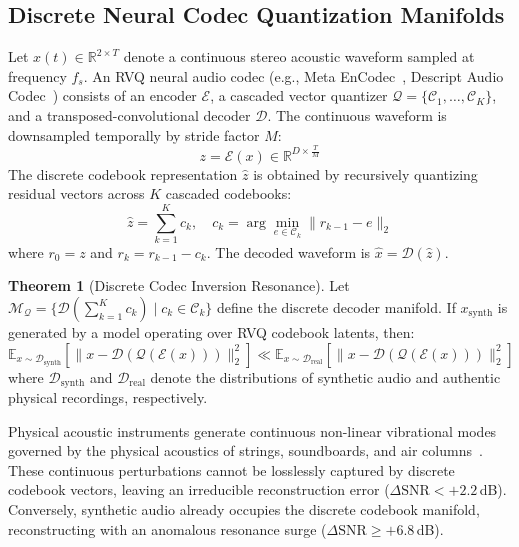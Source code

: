\documentclass[conference]{IEEEtran}
\theoremstyle{definition}
\newtheorem{theorem}{Theorem}
\begin{document}
\subsection{Discrete Neural Codec Quantization Manifolds}
Let $x(t) \in \mathbb{R}^{2 \times T}$ denote a continuous stereo acoustic waveform sampled at frequency $f_s$. An RVQ neural audio codec (e.g., Meta EnCodec~\cite{defossez2022high}, Descript Audio Codec~\cite{kumar2023high}) consists of an encoder $\mathcal{E}$, a cascaded vector quantizer $\mathcal{Q} = \{\mathcal{C}_1, \dots, \mathcal{C}_K\}$, and a transposed-convolutional decoder $\mathcal{D}$. The continuous waveform is downsampled temporally by stride factor $M$:
\begin{equation}
z = \mathcal{E}(x) \in \mathbb{R}^{D \times \frac{T}{M}}
\end{equation}
The discrete codebook representation $\hat{z}$ is obtained by recursively quantizing residual vectors across $K$ cascaded codebooks:
\begin{equation}
\hat{z} = \sum_{k=1}^K c_k, \quad c_k = \arg\min_{e \in \mathcal{C}_k} \| r_{k-1} - e \|_2
\end{equation}
where $r_0 = z$ and $r_k = r_{k-1} - c_k$. The decoded waveform is $\hat{x} = \mathcal{D}(\hat{z})$.

\begin{theorem}[Discrete Codec Inversion Resonance]
Let $\mathcal{M}_{\mathcal{Q}} = \{ \mathcal{D}(\sum_{k=1}^K c_k) \mid c_k \in \mathcal{C}_k \}$ define the discrete decoder manifold. If $x_{\text{synth}}$ is generated by a model operating over RVQ codebook latents, then:
\begin{equation}
\mathbb{E}_{x \sim \mathcal{D}_{\text{synth}}}\left[ \| x - \mathcal{D}(\mathcal{Q}(\mathcal{E}(x))) \|_2^2 \right] \ll \mathbb{E}_{x \sim \mathcal{D}_{\text{real}}}\left[ \| x - \mathcal{D}(\mathcal{Q}(\mathcal{E}(x))) \|_2^2 \right]
\end{equation}
where $\mathcal{D}_{\text{synth}}$ and $\mathcal{D}_{\text{real}}$ denote the distributions of synthetic audio and authentic physical recordings, respectively.
\end{theorem}

Physical acoustic instruments generate continuous non-linear vibrational modes governed by the physical acoustics of strings, soundboards, and air columns~\cite{fletcher2012physics}. These continuous perturbations cannot be losslessly captured by discrete codebook vectors, leaving an irreducible reconstruction error ($\Delta \text{SNR} < +2.2$\,dB). Conversely, synthetic audio already occupies the discrete codebook manifold, reconstructing with an anomalous resonance surge ($\Delta \text{SNR} \ge +6.8$\,dB).
\end{document}
